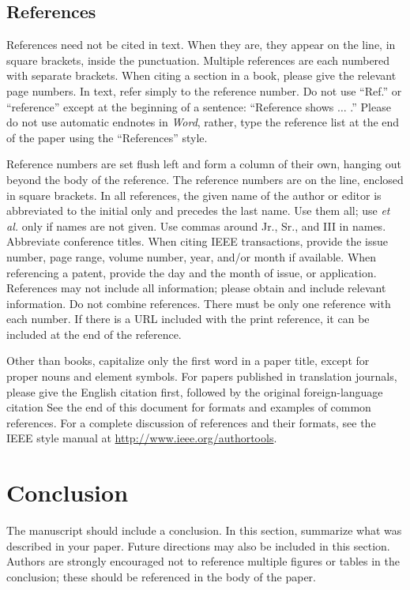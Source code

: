 \documentclass[]{IEEEibm}
\begin{document}
\subsection{References}


References need not be cited in text. When they are, they appear on the 
line, in square brackets, inside the punctuation. Multiple references are 
each numbered with separate brackets. When citing a section in a book, 
please give the relevant page numbers. In text, refer simply to the 
reference number. Do not use ``Ref.'' or ``reference'' except at the 
beginning of a sentence: ``Reference \cite{b3} shows $\ldots$ .'' Please do not use 
automatic endnotes in \emph{Word}, rather, type the reference list at the end of the 
paper using the ``References'' style.

Reference numbers are set flush left and form a column of their own, hanging 
out beyond the body of the reference. The reference numbers are on the line, 
enclosed in square brackets. In all references, the given name of the author 
or editor is abbreviated to the initial only and precedes the last name. Use 
them all; use \emph{et al.} only if names are not given. Use commas around Jr., 
Sr., and III in names. Abbreviate conference titles. When citing IEEE 
transactions, provide the issue number, page range, volume number, year, 
and/or month if available. When referencing a patent, provide the day and 
the month of issue, or application. References may not include all 
information; please obtain and include relevant information. Do not combine 
references. There must be only one reference with each number. If there is a 
URL included with the print reference, it can be included at the end of the 
reference. 

Other than books, capitalize only the first word in a paper title, except 
for proper nouns and element symbols. For papers published in translation 
journals, please give the English citation first, followed by the original 
foreign-language citation See the end of this document for formats and 
examples of common references. For a complete discussion of references and 
their formats, see the IEEE style manual at
\url{http://www.ieee.org/authortools}.

\section{Conclusion}

The manuscript should include a conclusion. In this section, summarize what was described in your paper. Future directions may also be included in this section. Authors are strongly encouraged not to reference multiple figures or tables in the conclusion; these should be referenced in the body of the paper.
\end{document}
